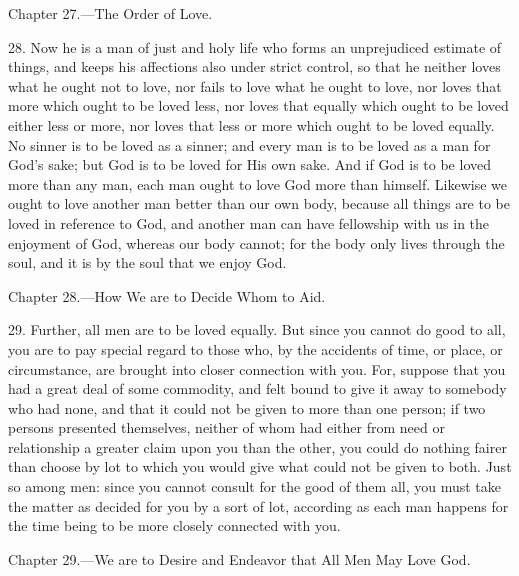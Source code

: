 
Chapter 27.—The Order of Love.

28. Now he is a man of just and holy life who forms an unprejudiced estimate of things, and keeps his affections also under strict control, so that he neither loves what he ought not to love, nor fails to love what he ought to love, nor loves that more which ought to be loved less, nor loves that equally which ought to be loved either less or more, nor loves that less or more which ought to be loved equally. No sinner is to be loved as a sinner; and every man is to be loved as a man for God’s sake; but God is to be loved for His own sake. And if God is to be loved more than any man, each man ought to love God more than himself. Likewise we ought to love another man better than our own body, because all things are to be loved in reference to God, and another man can have fellowship with us in the enjoyment of God, whereas our body cannot; for the body only lives through the soul, and it is by the soul that we enjoy God.


Chapter 28.—How We are to Decide Whom to Aid.

29. Further, all men are to be loved equally. But since you cannot do good to all, you are to pay special regard to those who, by the accidents of time, or place, or circumstance, are brought into closer connection with you. For, suppose that you had a great deal of some commodity, and felt bound to give it away to somebody who had none, and that it could not be given to more than one person; if two persons presented themselves, neither of whom had either from need or relationship a greater claim upon you than the other, you could do nothing fairer than choose by lot to which you would give what could not be given to both. Just so among men: since you cannot consult for the good of them all, you must take the matter as decided for you by a sort of lot, according as each man happens for the time being to be more closely connected with you.


Chapter 29.—We are to Desire and Endeavor that All Men May Love God.

